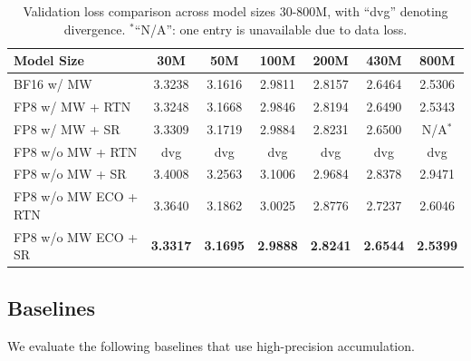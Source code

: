 \documentclass[11pt, a4paper, onecolumn, copyright, goog]{google}
\theoremstyle{plain}
\theoremstyle{definition}
\theoremstyle{remark}
\begin{document}
\begin{table}[t]
    \centering
    \caption{Validation loss comparison across model sizes 30-800M, with ``dvg'' denoting divergence. $^*$``N/A'': one entry is unavailable due to data loss.}
    \label{tab:loss_values}
    \begin{tabular}{lcccccc}
        \toprule
        \textbf{Model Size} & \textbf{30M} & \textbf{50M} & \textbf{100M} & \textbf{200M} & \textbf{430M} & \textbf{800M}\\
        \midrule
        BF16 w/ MW                        & 3.3238 & 3.1616 & 2.9811 & 2.8157 & 2.6464 & 2.5306 \\
        FP8 w/ MW + RTN                  & 3.3248 & 3.1668 & 2.9846 & 2.8194 & 2.6490 & 2.5343 \\
        FP8 w/ MW + SR              & 3.3309 & 3.1719 & 2.9884 & 2.8231 & 2.6500 & N/A$^*$ \\
        \midrule
        FP8 w/o MW + RTN             & dvg & dvg & dvg & dvg & dvg & dvg \\
        FP8 w/o MW + SR             & 3.4008 & 3.2563 & 3.1006 & 2.9684 & 2.8378 & 2.9471 \\
        FP8 w/o MW ECO + RTN         & 3.3640 & 3.1862 & 3.0025 & 2.8776 & 2.7237 & 2.6046 \\
        FP8 w/o MW ECO + SR         & \textbf{3.3317} & \textbf{3.1695} & \textbf{2.9888} & \textbf{2.8241} & \textbf{2.6544} & \textbf{2.5399} \\
        \bottomrule
    \end{tabular}
\end{table}

\subsection{Baselines}
We evaluate the following baselines that use high-precision accumulation.
\end{document}
